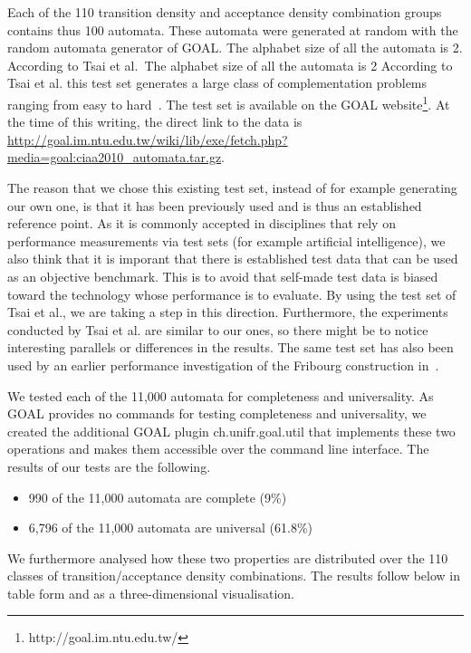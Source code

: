Each of the 110 transition density and acceptance density combination groups contains thus 100 automata. These automata were generated at random with the random automata generator of GOAL. The alphabet size of all the automata is 2. According to Tsai et al.~The alphabet size of all the automata is 2 According to Tsai et al. this test set generates a large class of complementation problems ranging from easy to hard~\cite{2010_tsai}. The test set is available on the GOAL website\footnote{http://goal.im.ntu.edu.tw/}. At the time of this writing, the direct link to the data is \url{http://goal.im.ntu.edu.tw/wiki/lib/exe/fetch.php?media=goal:ciaa2010_automata.tar.gz}.

The reason that we chose this existing test set, instead of for example generating our own one, is that it has been previously used and is thus an established reference point. As it is commonly accepted in disciplines that rely on performance measurements via test sets (for example artificial intelligence), we also think that it is imporant that there is established test data that can be used as an objective benchmark. This is to avoid that self-made test data is biased toward the technology whose performance is to evaluate. By using the test set of Tsai et al., we are taking a step in this direction. Furthermore, the experiments conducted by Tsai et al. are similar to our ones, so there might be to notice interesting parallels or differences in the results. The same test set has also been used by an earlier performance investigation of the Fribourg construction in~\cite{2013_bsc_goettel}.

We tested each of the 11,000 automata for completeness and universality. As GOAL provides no commands for testing completeness and universality, we created the additional GOAL plugin \textsf{ch.unifr.goal.util} that implements these two operations and makes them accessible over the command line interface. The results of our tests are the following.

\begin{itemize}
\item 990 of the 11,000 automata are complete (9\%)
\item 6,796 of the 11,000 automata are universal (61.8\%)
\end{itemize}

We furthermore analysed how these two properties are distributed over the 110 classes of transition/acceptance density combinations. The results follow below in table form and as a three-dimensional visualisation.

